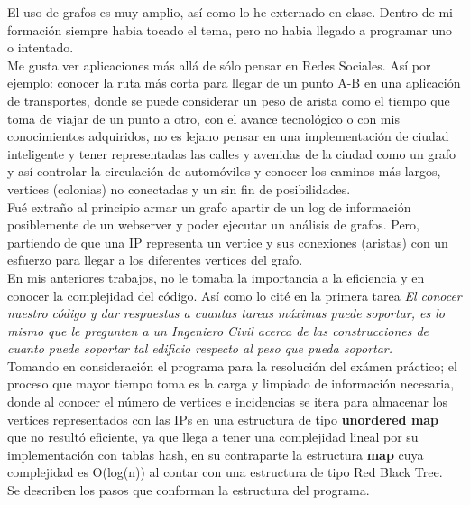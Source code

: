 \documentclass{article}
\begin{document}
  El uso de grafos es muy amplio, así como lo he externado en clase. Dentro de mi formación siempre habia tocado el tema, pero no habia llegado a programar uno o intentado.\\

  Me gusta ver aplicaciones más allá de sólo pensar en Redes Sociales. Así por ejemplo: conocer la ruta más corta para llegar de un punto A-B en una aplicación de transportes, donde se puede considerar un peso de arista como el tiempo que toma de viajar de un punto a otro, con el avance tecnológico o con mis conocimientos adquiridos, no es lejano pensar en una implementación de ciudad inteligente y tener representadas las calles y avenidas de la ciudad como un grafo y así controlar la circulación de automóviles y conocer los caminos más largos, vertices (colonias) no conectadas y un sin fin de posibilidades.\\

  Fué extraño al principio armar un grafo apartir de un log de información posiblemente de un webserver y poder ejecutar un análisis de grafos. Pero, partiendo de que una IP representa un vertice y sus conexiones (aristas) con un esfuerzo para llegar a los diferentes vertices del grafo.\\

  En mis anteriores trabajos, no le tomaba la importancia a la eficiencia y en conocer la complejidad del código. Así como lo cité en la primera tarea \textit{El conocer nuestro código y dar respuestas a cuantas tareas máximas puede soportar, es lo mismo que le pregunten a un Ingeniero Civil acerca de las construcciones de cuanto puede soportar tal edificio respecto al peso que pueda soportar.}\\

  Tomando en consideración el programa para la resolución del exámen práctico; el proceso que mayor tiempo toma es la carga y limpiado de información necesaria, donde al conocer el número de vertices e incidencias se itera para almacenar los vertices representados con las IPs en una estructura de tipo \textbf{unordered map} que no resultó eficiente, ya que llega a tener una complejidad lineal por su implementación con tablas hash, en su contraparte la estructura \textbf{map} cuya complejidad es O(log(n)) al contar con una estructura de tipo Red Black Tree.\\

  Se describen los pasos que conforman la estructura del programa.
  
\end{document}
